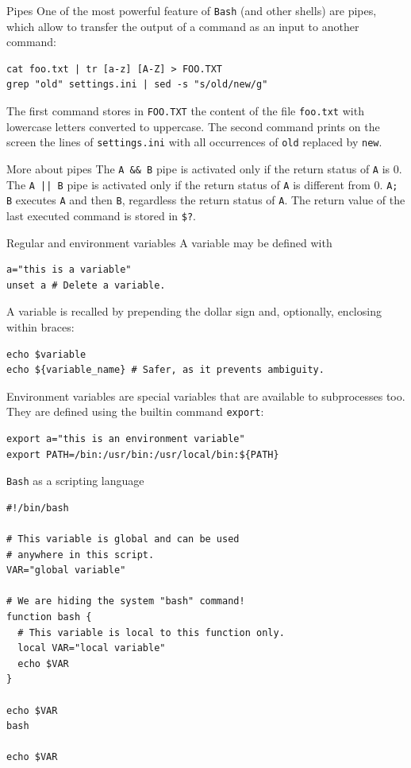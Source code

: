 \documentclass{beamer}
\begin{document}
\begin{frame}[fragile]{Pipes}
One of the most powerful feature of \texttt{Bash} (and other shells) are pipes, which allow to transfer the output of a command as an input to another command:
\begin{lstlisting}
cat foo.txt | tr [a-z] [A-Z] > FOO.TXT
grep "old" settings.ini | sed -s "s/old/new/g"
\end{lstlisting}
The first command stores in \texttt{FOO.TXT} the content of the file \texttt{foo.txt} with lowercase letters converted to uppercase. The second command prints on the screen the lines of \texttt{settings.ini} with all occurrences of \texttt{old} replaced by \texttt{new}.
\end{frame}

\begin{frame}{More about pipes}
The \texttt{A \&\& B} pipe is activated only if the return status of \texttt{A} is 0.
\vfill
The \texttt{A || B} pipe is activated only if the return status of \texttt{A} is different from 0.
\vfill
\texttt{A; B} executes \texttt{A} and then \texttt{B}, regardless the return status of \texttt{A}.
\vfill
The return value of the last executed command is stored in \texttt{\$?}.
\end{frame}

\begin{frame}[fragile]{Regular and environment variables}
A variable may be defined with
\begin{lstlisting}
a="this is a variable"
unset a # Delete a variable.
\end{lstlisting}
\vfill
A variable is recalled by prepending the dollar sign and, optionally, enclosing within braces:
\begin{lstlisting}
echo $variable
echo ${variable_name} # Safer, as it prevents ambiguity.
\end{lstlisting}
\vfill
Environment variables are special variables that are available to subprocesses too. They are defined using the builtin command \texttt{export}:
\begin{lstlisting}
export a="this is an environment variable"
export PATH=/bin:/usr/bin:/usr/local/bin:${PATH}
\end{lstlisting}
\end{frame}

\begin{frame}[fragile]{\texttt{Bash} as a scripting language}
\begin{lstlisting}
#!/bin/bash

# This variable is global and can be used
# anywhere in this script.
VAR="global variable"

# We are hiding the system "bash" command!
function bash {
  # This variable is local to this function only.
  local VAR="local variable"
  echo $VAR
}

echo $VAR
bash

echo $VAR
\end{lstlisting}
\end{frame}
\end{document}
